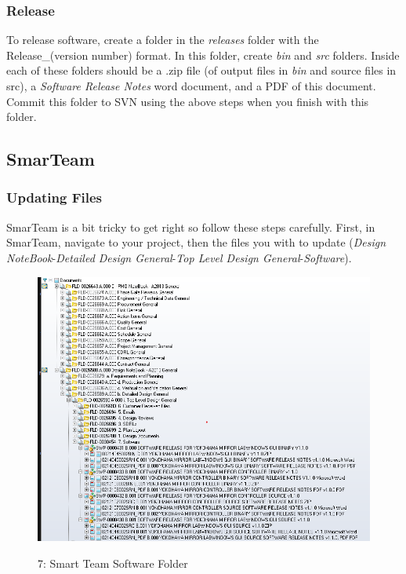 \documentclass[10pt]{article}
\begin{document}
            \subsubsection{Release}
                To release software, create a folder in the \emph{releases} folder with the Release\_(version number) format. In this folder, create \emph{bin} and \emph{src} folders. Inside each of these folders should be a .zip file (of output files in \emph{bin} and source files in {src}), a \emph{Software Release Notes} word document, and a PDF of this document. Commit this folder to SVN using the above steps when you finish with this folder.
        \subsection{SmarTeam}
            \subsubsection{Updating Files}
                SmarTeam is a bit tricky to get right so follow these steps carefully. First, in SmarTeam, navigate to your project, then the files you with to update (\emph{Design NoteBook}-\emph{Detailed Design General}-\emph{Top Level Design General}-\emph{Software}).
                \begin{figure}[H]
                    \centerline{\includegraphics[width=\textwidth]{References/ST Software Folder.png}}
                    \figurename{ 7: Smart Team Software Folder}
                \end{figure}
\end{document}
